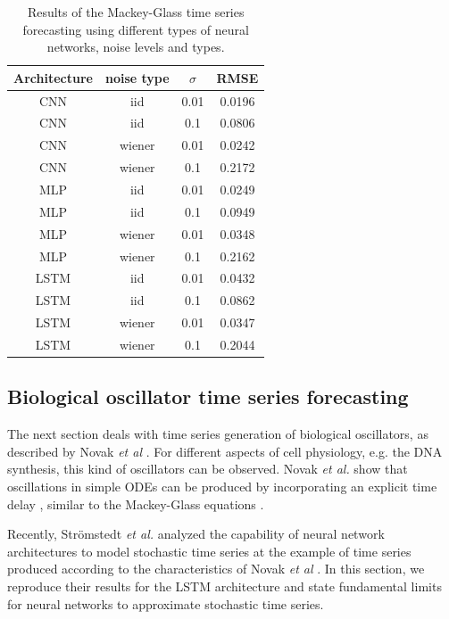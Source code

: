 \documentclass{article}
\begin{document}
\begin{table}
    \centering
    \begin{tabular}{c|c|c|c}
        Architecture & noise type & $\sigma$ & RMSE   \\
        \hline
        CNN          & iid        & 0.01     & 0.0196 \\
        CNN          & iid        & 0.1      & 0.0806 \\
        CNN          & wiener     & 0.01     & 0.0242 \\
        CNN          & wiener     & 0.1      & 0.2172 \\
        MLP          & iid        & 0.01     & 0.0249 \\
        MLP          & iid        & 0.1      & 0.0949 \\
        MLP          & wiener     & 0.01     & 0.0348 \\
        MLP          & wiener     & 0.1      & 0.2162 \\
        LSTM         & iid        & 0.01     & 0.0432 \\
        LSTM         & iid        & 0.1      & 0.0862 \\
        LSTM         & wiener     & 0.01     & 0.0347 \\
        LSTM         & wiener     & 0.1      & 0.2044 \\
    \end{tabular}
    \caption{Results of the Mackey-Glass time series forecasting using different
        types of neural networks, noise levels and types.}
    \label{tab:mackey_noise}
\end{table}

\subsection{Biological oscillator time series forecasting}

The next section deals with time series generation of biological oscillators,
as described by Novak \textit{et al} \cite{novak2008}. For different aspects of
cell physiology, e.g. the DNA synthesis, this kind of oscillators can be
observed. Novak \textit{et al.} show that oscillations in simple ODEs can be
produced by incorporating an explicit time delay \cite{novak2008}, similar to
the Mackey-Glass equations \cite{mackey1977}.

Recently, Strömstedt \textit{et al.} analyzed the capability of neural network
architectures to model stochastic time series \cite{stroemstedt2018} at the
example of time series produced according to the characteristics of Novak
\textit{et al} \cite{novak2008}. In this section, we reproduce their results for
the LSTM architecture and state fundamental limits for neural networks to
approximate stochastic time series.
\end{document}
